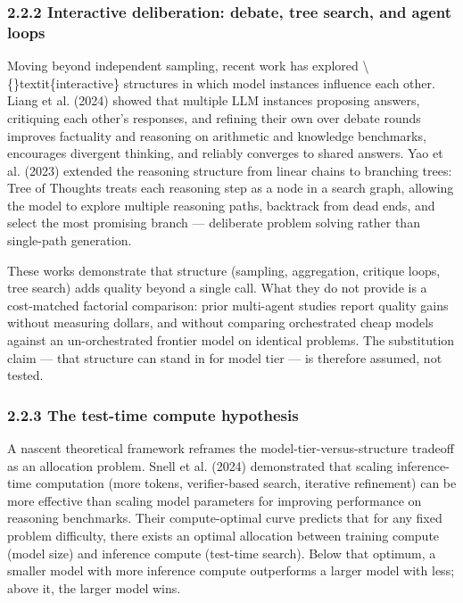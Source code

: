 \documentclass[11pt,a4paper]{article}
\begin{document}
\subsubsection{2.2.2 Interactive deliberation: debate, tree search, and agent loops}

Moving beyond independent sampling, recent work has explored \textbackslash\{\}textit\{interactive\}
structures in which model instances influence each other. Liang et al.
(2024) showed that multiple LLM instances proposing answers, critiquing each
other's responses, and refining their own over debate rounds improves
factuality and reasoning on arithmetic and knowledge benchmarks, encourages
divergent thinking, and reliably converges to shared answers. Yao et al.
(2023) extended the reasoning structure from linear chains to branching
trees: Tree of Thoughts treats each reasoning step as a node in a search
graph, allowing the model to explore multiple reasoning paths, backtrack
from dead ends, and select the most promising branch — deliberate problem
solving rather than single-path generation.

These works demonstrate that structure (sampling, aggregation, critique
loops, tree search) adds quality beyond a single call. What they do not
provide is a cost-matched factorial comparison: prior multi-agent studies
report quality gains without measuring dollars, and without comparing
orchestrated cheap models against an un-orchestrated frontier model on
identical problems. The substitution claim — that structure can stand in
for model tier — is therefore assumed, not tested.

\subsubsection{2.2.3 The test-time compute hypothesis}

A nascent theoretical framework reframes the model-tier-versus-structure
tradeoff as an allocation problem. Snell et al. (2024) demonstrated that
scaling inference-time computation (more tokens, verifier-based search,
iterative refinement) can be more effective than scaling model parameters
for improving performance on reasoning benchmarks. Their compute-optimal
curve predicts that for any fixed problem difficulty, there exists an
optimal allocation between training compute (model size) and inference
compute (test-time search). Below that optimum, a smaller model with more
inference compute outperforms a larger model with less; above it, the
larger model wins.
\end{document}
